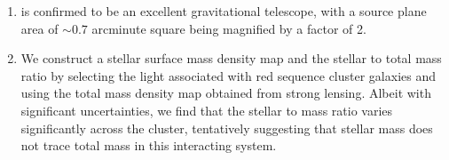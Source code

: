 \begin{enumerate}
\item \cler is confirmed to be an excellent gravitational telescope, with a source plane area of $\sim0.7$ arcminute square being 
  magnified by a factor of 2.

\item We construct a stellar surface mass density map and the stellar to total mass ratio by selecting the light associated with red sequence cluster galaxies and using the total mass density map obtained from strong lensing. Albeit with significant uncertainties, we find that the stellar to mass ratio varies significantly across the cluster, tentatively suggesting that stellar mass does not trace total mass in this interacting system.

\end{enumerate}

